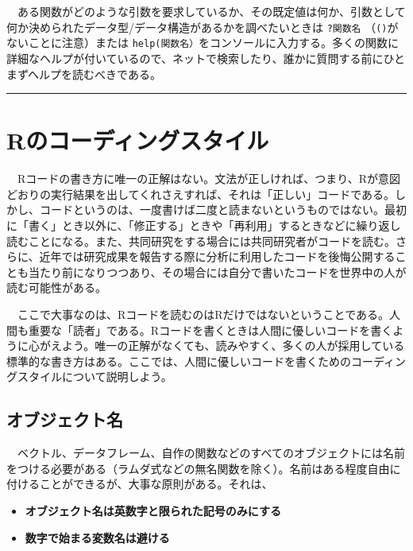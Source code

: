 \documentclass[
  a4paper,
  pandoc,
  ja=standard,
  jafont=haranoaji]{bxjsbook}
\providecommand{\tightlist}{%
  \setlength{\itemsep}{0pt}\setlength{\parskip}{0pt}}
\begin{document}
　ある関数がどのような引数を要求しているか、その既定値は何か、引数として何か決められたデータ型/データ構造があるかを調べたいときは
\texttt{?関数名} （\texttt{()}がないことに注意）または
\texttt{help(関数名）}をコンソールに入力する。多くの関数に詳細なヘルプが付いているので、ネットで検索したり、誰かに質問する前にひとまずヘルプを読むべきである。

\begin{center}\rule{0.5\linewidth}{0.5pt}\end{center}

\hypertarget{sec-programming_style}{%
\section{Rのコーディングスタイル}\label{sec-programming_style}}

　Rコードの書き方に唯一の正解はない。文法が正しければ、つまり、Rが意図どおりの実行結果を出してくれさえすれば、それは「正しい」コードである。しかし、コードというのは、一度書けば二度と読まないというものではない。最初に「書く」とき以外に、「修正する」ときや「再利用」するときなどに繰り返し読むことになる。また、共同研究をする場合には共同研究者がコードを読む。さらに、近年では研究成果を報告する際に分析に利用したコードを後悔公開することも当たり前になりつつあり、その場合には自分で書いたコードを世界中の人が読む可能性がある。

　ここで大事なのは、Rコードを読むのはRだけではないということである。人間も重要な「読者」である。Rコードを書くときは人間に優しいコードを書くように心がえよう。唯一の正解がなくても、読みやすく、多くの人が採用している標準的な書き方はある。ここでは、人間に優しいコードを書くためのコーディングスタイルについて説明しよう。

\hypertarget{ux30aaux30d6ux30b8ux30a7ux30afux30c8ux540d}{%
\subsection{オブジェクト名}\label{ux30aaux30d6ux30b8ux30a7ux30afux30c8ux540d}}

　ベクトル、データフレーム、自作の関数などのすべてのオブジェクトには名前をつける必要がある（ラムダ式などの無名関数を除く）。名前はある程度自由に付けることができるが、大事な原則がある。それは、

\begin{itemize}
\tightlist
\item
  \textbf{オブジェクト名は英数字と限られた記号のみにする}
\item
  \textbf{数字で始まる変数名は避ける}
\end{itemize}
\end{document}
